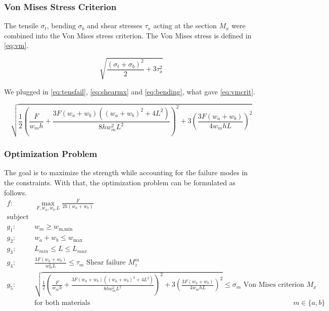 \subsubsection{Von Mises Stress Criterion}
The tensile $\sigma_t$, bending $\sigma_b$ and shear stresses $\tau_x$ acting at the section $M_x$ were combined into the Von Mises stress criterion. The Von Mises stress is defined in \autoref{eq:vm}.

\begin{equation}
	\label{eq:vm}
	\sqrt{\frac{\left( \sigma_t + \sigma_b \right)^2}{2} + 3\tau_x ^2}
\end{equation}

We plugged in \autoref{eq:tensfail}, \ref{eq:shearmx} and \ref{eq:bending}, what gave \ref{eq:vmcrit}.

\begin{equation}
	\label{eq:vmcrit}
	\sqrt{\frac{1}{2} \left( \frac{F}{w_m  h} + 	\frac{ 3 F \left(w_a + w_b \right) \left(\left(w_a + w_b \right) ^2 + 4L^2 \right)  }{ 8h w_m^2 L^2 }   \right)^2+ 3\left(	\frac{ 3 F \left(w_a + w_b \right) }{ 4  w_m h L }  \right) ^2}
\end{equation}


\subsubsection{Optimization Problem}
The goal is to maximize the strength while accounting for the failure modes in the constraints.
With that, the optimization problem can be formulated as follows. 
\begin{align*}
	f: & \max_{F, {w_a}, {w_b}. L} \frac{F}{2h \left(w_a + w_b\right)} \nonumber \\
	\text{subject to:} & \nonumber \\
	g_1: & w_m \ge w_\text{m,min} \\
	g_2: & w_a + w_b \le w_\text{max} \\
	g_3: & L_{min} \le L \le L_{max} \\
	g_4: & \frac{ 3 F \left(w_a + w_b \right) }{ w_m ^2 L} \le \tau_m						\text{ Shear failure } M_z^m \\
	g_5:& \sqrt{\frac{1}{2} \left( \frac{F}{w_m  h} + 	\frac{ 3 F \left(w_a + w_b \right) \left(\left(w_a + w_b \right) ^2 + 4L^2 \right)  }{ 8h w_m^2 L^2 }   \right)^2+ 3\left(	\frac{ 3 F \left(w_a + w_b \right) }{ 4  w_m h L}  \right) ^2}		\le 	\sigma_m	\text{ Von Mises criterion } M_x \\
	& \text{for both materials } && m \in \{a, b\} \nonumber 
\end{align*}


